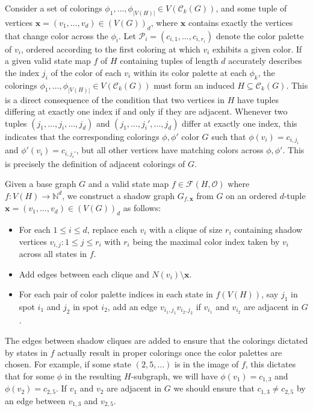 \documentclass[12pt,reqno,dvipsnames]{amsart}
\theoremstyle{definition}
\begin{document}
Consider a set of colorings $\phi_1,\dots,\phi_{|V(H)|}\in V(\mathcal{C}_k(G))$, and some tuple of vertices $\mathbf{x}=(v_1,\dots,v_d)\in (V(G))_d$, where $\mathbf{x}$ contains exactly the vertices that change color across the $\phi_i$. Let $\mathcal{P}_i=(c_{i,1},\dots,c_{i,r_i})$ denote the color palette of $v_i$, ordered according to the first coloring at which $v_i$ exhibits a given color. If a given valid state map $f$ of $H$ containing tuples of length $d$ accurately describes the index $j_i$ of the color of each $v_i$ within its color palette at each $\phi_k$, the colorings $\phi_1,\dots,\phi_{|V(H)|}\in V(\mathcal{C}_k(G))$ must form an induced $H\subseteq \mathcal{C}_k(G)$. This is a direct consequence of the condition that two vertices in $H$ have tuples differing at exactly one index if and only if they are adjacent. Whenever two tuples $(j_1,\dots,j_i,\dots,j_d)$ and $(j_1,\dots,j_i',\dots,j_d)$ differ at exactly one index, this indicates that the corresponding colorings $\phi,\phi'$ color $G$ such that $\phi(v_i)=c_{i,j_i}$ and $\phi'(v_i)=c_{i,j_i'}$, but all other vertices have matching colors across $\phi,\phi'$. This is precisely the definition of adjacent colorings of $G$.

Given a base graph $G$ and a valid state map $f\in\mathcal{F}(H,\mathcal{O})$ where $f\colon V(H)\to\mathbb{N}^{d}$, we construct a shadow graph $G_{f,\mathbf{x}}$ from $G$ on an ordered $d$-tuple $\mathbf{x}=(v_1, \dots, v_d)\in (V(G))_d$ as follows: 
\begin{itemize}
    \item For each $1\leq i\leq d$, replace each $v_i$ with a clique of size $r_i$ containing shadow vertices $v_{i,j} : 1 \leq j \leq r_i$ with $r_i$ being the maximal color index taken by $v_i$ across all states in $f$.
    \item Add edges between each clique and $N(v_i)\setminus \mathbf{x}$.
    \item For each pair of color palette indices in each state in $f(V(H))$, say $j_1$ in spot $i_1$ and $j_2$ in spot $i_2$, add an edge $v_{i_1,j_1}v_{i_2,j_2}$ if $v_{i_1}$ and $v_{i_2}$ are adjacent in $G$.
\end{itemize}
The edges between shadow cliques are added to ensure that the colorings dictated by states in $f$ actually result in proper colorings once the color palettes are chosen. For example, if some state $(2,5,\dots)$ is in the image of $f$, this dictates that for some $\phi$ in the resulting $H$-subgraph, we will have $\phi(v_1)=c_{1,3}$ and $\phi(v_2)=c_{2,5}$. If $v_1$ and $v_2$ are adjacent in $G$ we should ensure that $c_{1,3}\ne c_{2,5}$ by an edge between $v_{1,3}$ and $v_{2,5}$.
\end{document}
